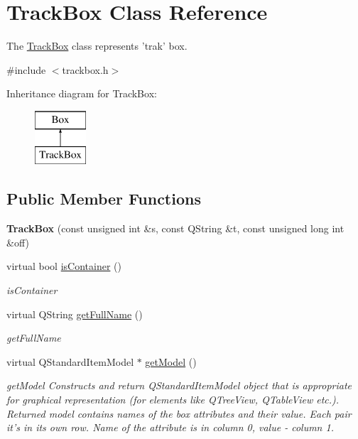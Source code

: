 \hypertarget{class_track_box}{\section{Track\-Box Class Reference}
\label{class_track_box}
}


The \hyperlink{class_track_box}{Track\-Box} class represents 'trak' box.  




{\ttfamily \#include $<$trackbox.\-h$>$}

Inheritance diagram for Track\-Box\-:\begin{figure}[H]
\begin{center}
\leavevmode
\includegraphics[height=2.000000cm]{class_track_box}
\end{center}
\end{figure}
\subsection*{Public Member Functions}
\begin{DoxyCompactItemize}
\item 
\hypertarget{class_track_box_a5f1fb1f8e88153395f72ed33d009c8af}{{\bfseries Track\-Box} (const unsigned int \&s, const Q\-String \&t, const unsigned long int \&off)}\label{class_track_box_a5f1fb1f8e88153395f72ed33d009c8af}

\item 
virtual bool \hyperlink{class_track_box_a9e3d52a20872169fc6f29c09f1e2ce95}{is\-Container} ()
\begin{DoxyCompactList}\small\item\em is\-Container \end{DoxyCompactList}\item 
virtual Q\-String \hyperlink{class_track_box_a2d45d42edb82a5445d54e184894aa730}{get\-Full\-Name} ()
\begin{DoxyCompactList}\small\item\em get\-Full\-Name \end{DoxyCompactList}\item 
virtual Q\-Standard\-Item\-Model $\ast$ \hyperlink{class_track_box_ab1412b2b26163ad23191427e6e934b90}{get\-Model} ()
\begin{DoxyCompactList}\small\item\em get\-Model Constructs and return Q\-Standard\-Item\-Model object that is appropriate for graphical representation (for elements like Q\-Tree\-View, Q\-Table\-View etc.). Returned model contains names of the box attributes and their value. Each pair it's in its own row. Name of the attribute is in column 0, value -\/ column 1. \end{DoxyCompactList}\end{DoxyCompactItemize}
